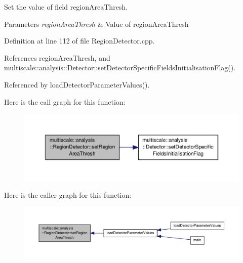 Set the value of field region\-Area\-Thresh. 


\begin{DoxyParams}{Parameters}
{\em region\-Area\-Thresh} & Value of region\-Area\-Thresh \\
\hline
\end{DoxyParams}


Definition at line 112 of file Region\-Detector.\-cpp.



References region\-Area\-Thresh, and multiscale\-::analysis\-::\-Detector\-::set\-Detector\-Specific\-Fields\-Initialisation\-Flag().



Referenced by load\-Detector\-Parameter\-Values().



Here is the call graph for this function\-:
\nopagebreak
\begin{figure}[H]
\begin{center}
\leavevmode
\includegraphics[width=350pt]{classmultiscale_1_1analysis_1_1RegionDetector_a5cf10aea88e85198ce54df0e94e6d1a7_cgraph}
\end{center}
\end{figure}




Here is the caller graph for this function\-:
\nopagebreak
\begin{figure}[H]
\begin{center}
\leavevmode
\includegraphics[width=350pt]{classmultiscale_1_1analysis_1_1RegionDetector_a5cf10aea88e85198ce54df0e94e6d1a7_icgraph}
\end{center}
\end{figure}


